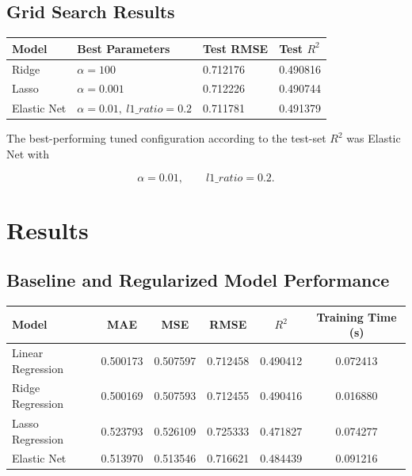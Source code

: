 \documentclass[12pt,a4paper]{article}
\begin{document}
\subsection{Grid Search Results}

\begin{longtable}{|p{3.5cm}|p{3.2cm}|p{3.2cm}|p{3cm}|}
\hline
\textbf{Model} & \textbf{Best Parameters} &
\textbf{Test RMSE} & \textbf{Test $R^2$} \\ \hline

Ridge &
$\alpha=100$ &
0.712176 &
0.490816 \\ \hline

Lasso &
$\alpha=0.001$ &
0.712226 &
0.490744 \\ \hline

Elastic Net &
$\alpha=0.01,\ l1\_ratio=0.2$ &
0.711781 &
0.491379 \\ \hline

\end{longtable}

The best-performing tuned configuration according to the test-set
$R^2$ was Elastic Net with

\[
\boxed{\alpha=0.01,\qquad l1\_ratio=0.2}.
\]


\section{Results}

\subsection{Baseline and Regularized Model Performance}

\begin{longtable}{|p{4cm}|c|c|c|c|c|}
\hline
\textbf{Model} &
\textbf{MAE} &
\textbf{MSE} &
\textbf{RMSE} &
\textbf{$R^2$} &
\textbf{Training Time (s)}
\\ \hline

Linear Regression &
0.500173 &
0.507597 &
0.712458 &
0.490412 &
0.072413
\\ \hline

Ridge Regression &
0.500169 &
0.507593 &
0.712455 &
0.490416 &
0.016880
\\ \hline

Lasso Regression &
0.523793 &
0.526109 &
0.725333 &
0.471827 &
0.074277
\\ \hline

Elastic Net &
0.513970 &
0.513546 &
0.716621 &
0.484439 &
0.091216
\\ \hline

\end{longtable}
\end{document}

